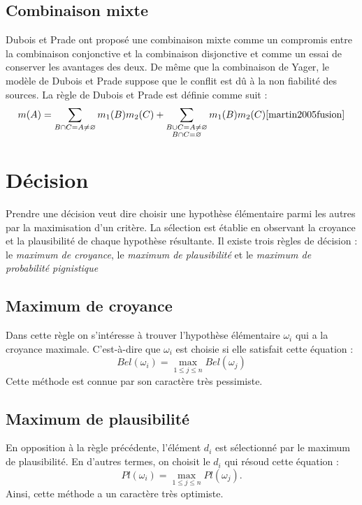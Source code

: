 \subsection{Combinaison mixte}

Dubois et Prade ont proposé une combinaison mixte comme un compromis entre la
combinaison conjonctive et la combinaison disjonctive et comme un essai de conserver
les avantages des deux. De même que la combinaison de Yager, le modèle de Dubois
et Prade suppose que le conflit est dû à la non fiabilité des sources. La règle de
Dubois et Prade est définie comme suit :
\begin{equation}
m(A) = \sum_{B \cap C = A \neq \varnothing} m_1(B) m_2(C) +
\sum_{\substack{B \cup C = A \neq \varnothing \\ B \cap C = \varnothing}} m_1(B) m_2(C) \cite{martin2005fusion}
\end{equation}

\section{Décision}

Prendre une décision veut dire choisir une hypothèse élémentaire parmi les autres
par la maximisation d'un critère. La sélection est établie en observant
la croyance et la plausibilité de chaque hypothèse résultante. Il existe trois règles
de décision : le \emph{maximum de croyance}, le \emph{maximum de plausibilité} et le
\emph{maximum de probabilité pignistique}

\subsection{Maximum de croyance}

Dans cette règle on s'intéresse à trouver l'hypothèse élémentaire $\omega_i$ qui
a la croyance maximale. C'est-à-dire que $\omega_i$ est choisie si elle satisfait cette
équation :
\begin{equation}
Bel(\omega_i) = \max_{1 \leq j \leq n} Bel(\omega_j)
\end{equation}
Cette méthode est connue par son caractère très pessimiste.

\subsection{Maximum de plausibilité}

En opposition à la règle précédente, l'élément $d_i$ est sélectionné par le maximum
de plausibilité. En d'autres termes, on choisit le $d_i$ qui résoud cette équation :
\begin{equation}
Pl(\omega_i) = \max_{1 \leq j \leq n} Pl(\omega_j).
\end{equation}
Ainsi, cette méthode a un caractère très optimiste.\cite{kZebouchiThesis}

